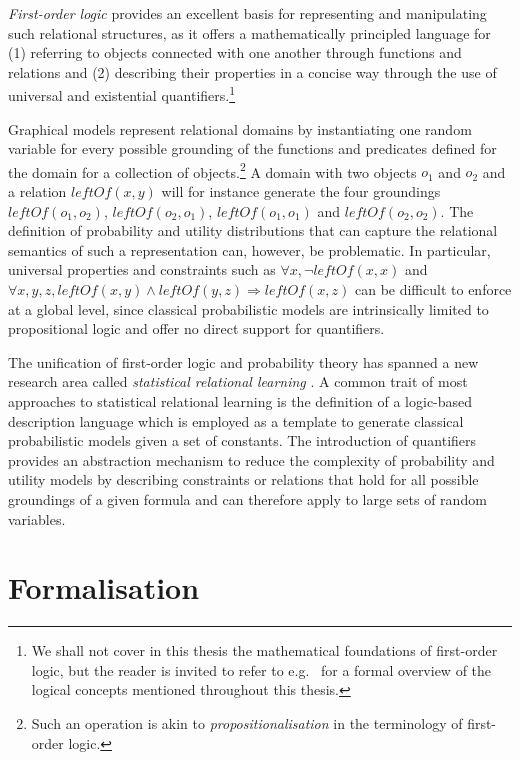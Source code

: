 \textit{First-order logic} provides an excellent basis for representing and manipulating such relational structures, as it offers a mathematically principled language for (1) referring to objects connected with one another through functions and relations and (2) describing their properties in a concise way through the use of universal and existential quantifiers.\footnote{We shall not cover in this thesis the mathematical foundations of first-order logic, but the reader is invited to refer to e.g.\ \cite{gamut1991logic} for a formal overview of the logical concepts mentioned throughout this thesis.}

Graphical models represent relational domains by instantiating one random variable for every possible grounding of the functions and predicates defined for the domain for a collection of objects.\footnote{Such an operation is akin to \textit{propositionalisation} in the terminology of first-order logic.}  A domain with two objects $o_1$ and $o_2$ and a relation $\mathit{leftOf}(x,y)$ will for instance generate the four groundings $\mathit{leftOf}(o_1,o_2)$, $\mathit{leftOf}(o_2,o_1)$, $\mathit{leftOf}(o_1,o_1)$ and $\mathit{leftOf}(o_2,o_2)$. The definition of probability and utility distributions that can capture the relational semantics of such a representation can, however, be problematic. In particular, universal properties and constraints such as $\forall x, \neg \mathit{leftOf}(x,x)$ and $\forall x, y, z, \mathit{leftOf}(x,y) \land \mathit{leftOf}(y,z) \Rightarrow \mathit{leftOf}(x,z)$ can be difficult to enforce at a global level, since classical probabilistic models are intrinsically limited to propositional logic and offer no direct support for quantifiers. 
 
The unification of first-order logic and probability theory has spanned a new research area called \textit{statistical relational learning} \citep{getoor:srlbook07}. A common trait of most approaches to statistical relational learning is the definition of a logic-based description language which is employed as a template to generate classical probabilistic models given a set of constants. The introduction of quantifiers provides an abstraction mechanism to reduce the complexity of probability and utility models by describing constraints or relations that hold for all possible groundings of a given formula and can therefore apply to large sets of random variables. 

\section{Formalisation}
\label{sec:formalisation}

